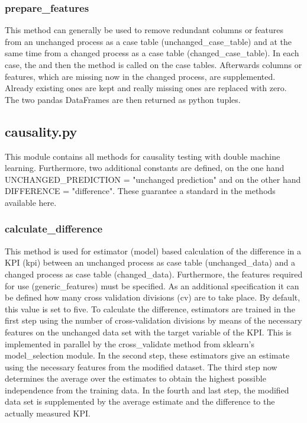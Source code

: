     \subsubsection*{prepare\_features}
    This method can generally be used to remove redundant columns or features from an unchanged process as a case table (unchanged\_case\_table) and at the same time from a changed process as a case table (changed\_case\_table). In each case, the  and then the  method is called on the case tables. Afterwards columns or features, which are missing now in the changed process, are supplemented. Already existing ones are kept and really missing ones are replaced with zero. The two pandas DataFrames are then returned as python tuples.\label{filter}

    \subsection{causality.py}
    This module contains all methods for causality testing with double machine learning. Furthermore, two additional constants are defined, on the one hand UNCHANGED\_PREDICTION = "unchanged prediction" and on the other hand DIFFERENCE = "difference". These guarantee a standard in the methods available here.
    \subsubsection*{calculate\_difference}
    This method is used for estimator (model) based calculation of the difference in a KPI (kpi) between an unchanged process as case table (unchanged\_data) and a changed process as case table (changed\_data). Furthermore, the features required for use (generic\_features) must be specified. As an additional specification it can be defined how many cross validation divisions (cv) are to take place. By default, this value is set to five.
    To calculate the difference, estimators are trained in the first step using the number of cross-validation divisions by means of the necessary features on the unchanged data set with the target variable of the KPI. This is implemented in parallel by the cross\_validate method from sklearn's model\_selection module. In the second step, these estimators give an estimate using the necessary features from the modified dataset. The third step now determines the average over the estimates to obtain the highest possible independence from the training data. In the fourth and last step, the modified data set is supplemented by the average estimate and the difference to the actually measured KPI.\label{difference}
